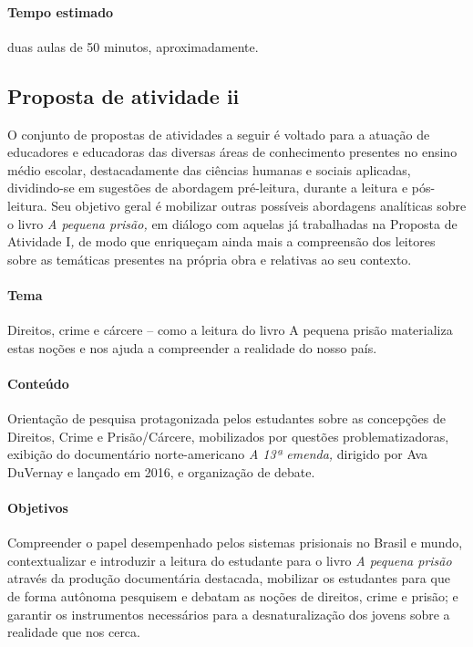 \documentclass[11pt]{extarticle}
\begin{document}
\paragraph{Tempo estimado} duas aulas de 50 minutos, aproximadamente.

\subsection{Proposta de atividade ii}

O conjunto de propostas de atividades a seguir é voltado para a atuação
de educadores e educadoras das diversas áreas de conhecimento presentes
no ensino médio escolar, destacadamente das ciências humanas e sociais
aplicadas, dividindo-se em sugestões de abordagem pré-leitura, durante a
leitura e pós-leitura. Seu objetivo geral é mobilizar outras possíveis
abordagens analíticas sobre o livro \emph{A pequena prisão,} em diálogo
com aquelas já trabalhadas na Proposta de Atividade I\emph{,} de modo
que enriqueçam ainda mais a compreensão dos leitores sobre as temáticas
presentes na própria obra e relativas ao seu contexto.

\paragraph{Tema} Direitos, crime e cárcere -- como a leitura do livro A
pequena prisão materializa estas noções e nos ajuda a compreender a
realidade do nosso país.

\paragraph{Conteúdo} Orientação de pesquisa protagonizada pelos estudantes
sobre as concepções de Direitos, Crime e Prisão/Cárcere, mobilizados por
questões problematizadoras, exibição do documentário norte-americano
\emph{A 13ª emenda,} dirigido por Ava DuVernay e lançado em 2016, e
organização de debate.

\paragraph{Objetivos} Compreender o papel desempenhado pelos sistemas
prisionais no Brasil e mundo, contextualizar e introduzir a leitura do
estudante para o livro \emph{A pequena prisão} através da produção
documentária destacada, mobilizar os estudantes para que de forma
autônoma pesquisem e debatam as noções de direitos, crime e prisão; e
garantir os instrumentos necessários para a desnaturalização dos jovens
sobre a realidade que nos cerca.
\end{document}
